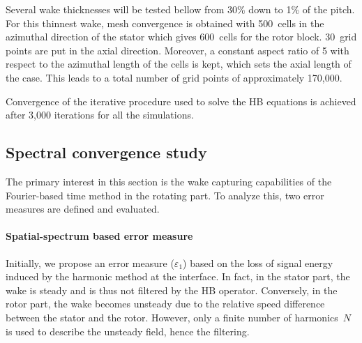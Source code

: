 Several wake thicknesses will be tested bellow
from 30\% down to 1\% of the pitch. For this thinnest wake, 
mesh convergence
is obtained with 500~cells in the azimuthal direction of
the stator which gives
600~cells for the rotor block.
30~grid points are put in the axial direction. Moreover, a constant
aspect ratio of 5 with respect to the azimuthal length of the cells is
kept, which sets the axial length of the case.
This leads to a total number of grid points of approximately 
170,000. 

Convergence of the iterative procedure used to solve the HB equations is achieved 
after 3,000 iterations for 
all the simulations. 

\subsection{Spectral convergence study}
The primary interest in this section is the wake capturing capabilities of the 
Fourier-based time method in the rotating part. 
To analyze this, two error measures are defined and
evaluated. 

\paragraph{Spatial-spectrum based error measure}
\label{sec:crit_1}
Initially, we propose an error measure ($\varepsilon_1$) based 
on the loss of signal energy
induced by the harmonic method at the interface. 
In fact, in the stator part, the wake is steady and is thus not
filtered by the HB operator. 
Conversely, in the rotor part, the wake becomes
unsteady due to the relative speed difference between the
stator and the rotor. However, only a finite number of harmonics~$N$
is used to describe the unsteady field, hence the filtering.

